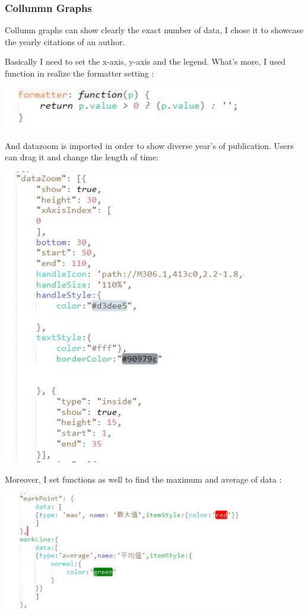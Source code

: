 \documentclass[10pt,twoside,a4paper,titlepage]{article}
\begin{document}
		\subsubsection{Collunmn Graphs}
			\par Collumn graphs can show clearly the exact number of data, I chose it to showcase the yearly citations of an author. 
			\par Basically I need to set the x-axis, y-axis and the legend. What's more, I used function in realize the formatter setting :\par
			\includegraphics[width=0.8\textwidth]{gjl/05.jpg}\par
			And datazoom is imported in order to show diverse year's of publication. Users can drag it and change the length of time:\par
			\includegraphics[width=0.8\textwidth]{gjl/06.jpg}\par
			Moreover, I set functions as well to find the maximum and average of data : \par
			\includegraphics[width=0.8\textwidth]{gjl/07.jpg}\par
\end{document}

